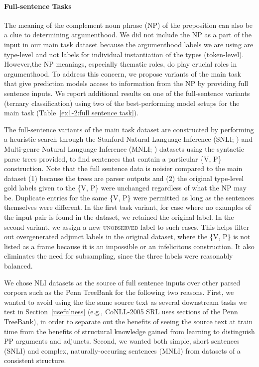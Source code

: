 \documentclass[letterpaper]{article} %
\begin{document}
\paragraph{Full-sentence Tasks} The meaning of the complement noun phrase (NP) of the preposition can also be a clue to determining argumenthood. We did not include the NP as a part of the input in our main task dataset because the argumenthood labels we are using are type-level and not labels for individual instantiation of the types (token-level). However,the NP meanings, especially thematic roles, do play crucial roles in argumenthood. To address this concern, we propose variants of the main task that give prediction models access to information from the NP by providing full sentence inputs. We report additional results on one of the full-sentence variants (ternary classification) using two of the best-performing model setups for the main task (Table~\ref{ex1-2:full sentence task}).

The full-sentence variants of the main task dataset are constructed by performing a heuristic search through the Stanford Natural Language Inference (SNLI; \cite{bowman2015large}) and Multi-genre Natural Language Inference (MNLI; \cite{williams2018broad}) datasets using the syntactic parse trees provided, to find sentences that contain a particular \{\textsc{V, P}\} construction. Note that the full sentence data is noisier compared to the main dataset (1) because the trees are parser outputs and (2) the original type-level gold labels given to the \{\textsc{V, P}\} were unchanged regardless of what the NP may be. Duplicate entries for the same \{\textsc{V, P}\} were permitted as long as the sentences themselves were different. In the first task variant, for case where no examples of the input pair is found in the dataset, we retained the original label. In the second variant, we assign a new \textsc{unobserved} label to such cases. This helps filter out overgenerated adjunct labels in the original dataset, where the \{\textsc{V, P}\} is not listed as a frame because it is an impossible or an infelicitous construction. It also eliminates the need for subsampling, since the three labels were reasonably balanced.

We chose NLI datasets as the source of full sentence inputs over other parsed corpora such as the Penn TreeBank for the following two reasons. First, we wanted to avoid using the the same source text as several downstream tasks we test in Section~\ref{usefulness} (e.g., CoNLL-2005 SRL \cite{carreras2005introduction} uses sections of the Penn TreeBank), in order to separate out the benefits of seeing the source text at train time from the benefits of structural knowledge gained from learning to distinguish PP arguments and adjuncts. Second, we wanted both simple, short sentences (SNLI) and complex, naturally-occuring sentences (MNLI) from datasets of a consistent structure.
\end{document}
